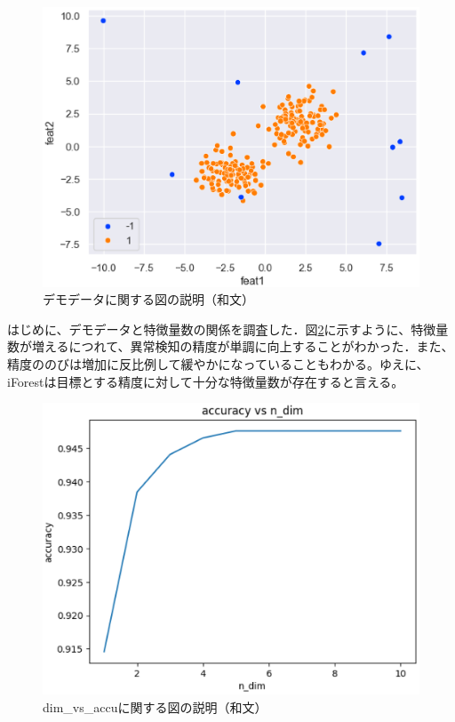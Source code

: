 \documentclass{css}
\begin{document}
\begin{figure}[tb]
    \centering
    \includegraphics[width=\linewidth]{pictures/eps/demodata.eps}
    \caption{デモデータに関する図の説明（和文）}
    \label{fig:demodata}
\end{figure}

はじめに、デモデータと特徴量数の関係を調査した．図\ref{fig:dim_vs_accu}に示すように、特徴量数が増えるにつれて、異常検知の精度が単調に向上することがわかった．また、精度ののびは増加に反比例して緩やかになっていることもわかる。ゆえに、iForestは目標とする精度に対して十分な特徴量数が存在すると言える。

\begin{figure}[tb]
    \centering
    \includegraphics[width=\linewidth]{pictures/eps/dim_vs_accu.eps}
    \caption{dim\_vs\_accuに関する図の説明（和文）}
    \label{fig:dim_vs_accu}
\end{figure}
\end{document}
